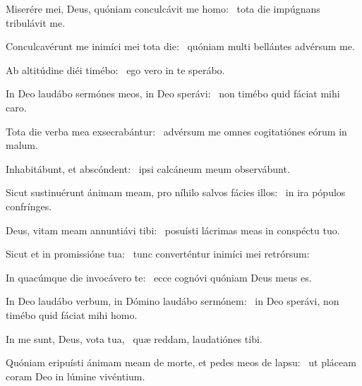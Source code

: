 \item Miserére mei, Deus, quóniam conculcávit me homo:~\psstar{} tota die impúgnans tribulávit me.

\item Conculcavérunt me inimíci mei tota die:~\psstar{} quóniam multi bellántes advérsum me.

\item Ab altitúdine diéi timébo:~\psstar{} ego vero in te sperábo.

\item In Deo laudábo sermónes meos, in Deo sperávi:~\psstar{} non timébo quid fáciat mihi caro.

\item Tota die verba mea exsecrabántur:~\psstar{} advérsum me omnes cogitatiónes eórum in malum.

\item Inhabitábunt, et abscóndent:~\psstar{} ipsi calcáneum meum observábunt.

\item Sicut sustinuérunt ánimam meam, pro níhilo salvos fácies illos:~\psstar{} in ira pópulos confrínges.

\item Deus, vitam meam annuntiávi tibi:~\psstar{} posuísti lácrimas meas in conspéctu tuo.

\item Sicut et in promissióne tua:~\psstar{} tunc converténtur inimíci mei retrórsum:

\item In quacúmque die invocávero te:~\psstar{} ecce cognóvi quóniam Deus meus es.

\item In Deo laudábo verbum, in Dómino laudábo sermónem:~\psstar{} in Deo sperávi, non timébo quid fáciat mihi homo.

\item In me sunt, Deus, vota tua,~\psstar{} quæ reddam, laudatiónes tibi.

\item Quóniam eripuísti ánimam meam de morte, et pedes meos de lapsu:~\psstar{} ut pláceam coram Deo in lúmine vivéntium.
